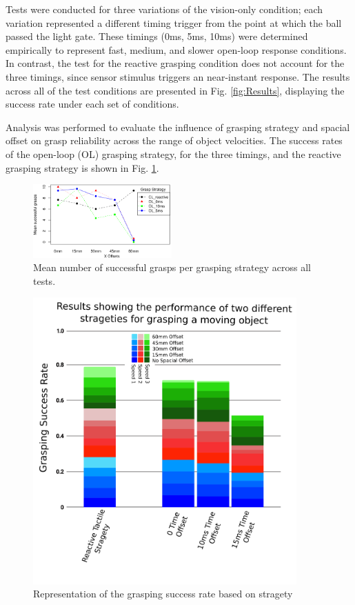 Tests were conducted for three variations of the vision-only condition; each variation represented a different timing trigger from the point at which the ball passed the light gate. These timings (0ms, 5ms, 10ms) were determined empirically to represent fast, medium, and slower open-loop response conditions. In contrast, the test for the reactive grasping condition does not account for the three timings, since sensor stimulus triggers an near-instant response. The results across all of the test conditions are presented in Fig. \ref{fig:Results}, displaying the success rate under each set of conditions.

Analysis was performed to evaluate the influence of grasping strategy and spacial offset on grasp reliability across the range of object velocities. The success rates of the open-loop (OL) grasping strategy, for the three timings, and the reactive grasping strategy is shown in Fig. \ref{fig:meangraph}.

\begin{figure}[ht]
    \centering
    \includegraphics[width=0.475\textwidth]{Images/resultsgraph.png}
    \caption{Mean number of successful grasps per grasping strategy across all tests.}
    \label{fig:meangraph}
\end{figure}%

\begin{figure}[ht]
    \centering
    \includegraphics[width=0.9\textwidth]{Images/CrosslandResults.png}
    \caption{Representation of the grasping success rate based on stragety}
    \label{fig:CrosslandGraph}
\end{figure}%

